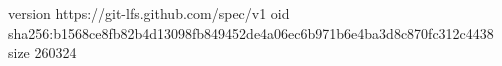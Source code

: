 version https://git-lfs.github.com/spec/v1
oid sha256:b1568ce8fb82b4d13098fb849452de4a06ec6b971b6e4ba3d8c870fc312c4438
size 260324
